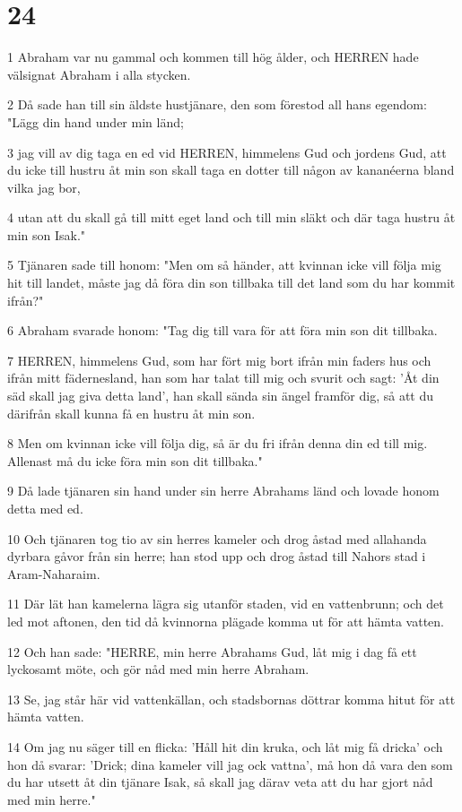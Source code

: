 \chapter{24}

\par 1 Abraham var nu gammal och kommen till hög ålder, och HERREN hade välsignat Abraham i alla stycken.
\par 2 Då sade han till sin äldste hustjänare, den som förestod all hans egendom: "Lägg din hand under min länd;
\par 3 jag vill av dig taga en ed vid HERREN, himmelens Gud och jordens Gud, att du icke till hustru åt min son skall taga en dotter till någon av kananéerna bland vilka jag bor,
\par 4 utan att du skall gå till mitt eget land och till min släkt och där taga hustru åt min son Isak."
\par 5 Tjänaren sade till honom: "Men om så händer, att kvinnan icke vill följa mig hit till landet, måste jag då föra din son tillbaka till det land som du har kommit ifrån?"
\par 6 Abraham svarade honom: "Tag dig till vara för att föra min son dit tillbaka.
\par 7 HERREN, himmelens Gud, som har fört mig bort ifrån min faders hus och ifrån mitt fädernesland, han som har talat till mig och svurit och sagt: 'Åt din säd skall jag giva detta land', han skall sända sin ängel framför dig, så att du därifrån skall kunna få en hustru åt min son.
\par 8 Men om kvinnan icke vill följa dig, så är du fri ifrån denna din ed till mig. Allenast må du icke föra min son dit tillbaka."
\par 9 Då lade tjänaren sin hand under sin herre Abrahams länd och lovade honom detta med ed.
\par 10 Och tjänaren tog tio av sin herres kameler och drog åstad med allahanda dyrbara gåvor från sin herre; han stod upp och drog åstad till Nahors stad i Aram-Naharaim.
\par 11 Där lät han kamelerna lägra sig utanför staden, vid en vattenbrunn; och det led mot aftonen, den tid då kvinnorna plägade komma ut för att hämta vatten.
\par 12 Och han sade: "HERRE, min herre Abrahams Gud, låt mig i dag få ett lyckosamt möte, och gör nåd med min herre Abraham.
\par 13 Se, jag står här vid vattenkällan, och stadsbornas döttrar komma hitut för att hämta vatten.
\par 14 Om jag nu säger till en flicka: 'Håll hit din kruka, och låt mig få dricka' och hon då svarar: 'Drick; dina kameler vill jag ock vattna', må hon då vara den som du har utsett åt din tjänare Isak, så skall jag därav veta att du har gjort nåd med min herre."
